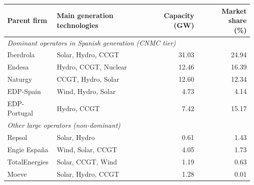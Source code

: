 \begin{tabular}{l p{4.8cm} r r}
\toprule
Parent firm & Main generation technologies & \makecell{Capacity\\(GW)} & \makecell{Market share\\(\%)} \\
\midrule
\multicolumn{4}{l}{\textit{Dominant operators in Spanish generation (CNMC tier)}} \\
Iberdrola & Solar, Hydro, CCGT & 31.03 & 24.94 \\
Endesa & Hydro, CCGT, Nuclear & 12.46 & 16.39 \\
Naturgy & CCGT, Hydro, Solar & 12.60 & 12.34 \\
EDP-Spain & Wind, Hydro, Solar & 4.73 & 4.14 \\
EDP-Portugal & Hydro, CCGT & 7.42 & 15.17 \\
\midrule
\multicolumn{4}{l}{\textit{Other large operators (non-dominant)}} \\
Repsol & Solar, Hydro & 0.61 & 1.43 \\
Engie España & Wind, Solar, CCGT & 4.05 & 1.73 \\
TotalEnergies & Solar, CCGT, Wind & 1.19 & 0.63 \\
Moeve & Solar, Hydro, CCGT & 1.28 & 0.01 \\
\bottomrule
\end{tabular}